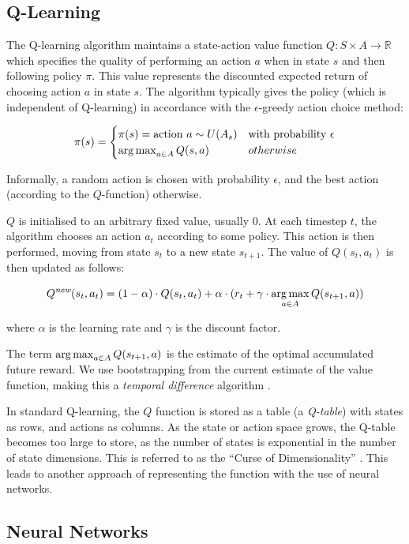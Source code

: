 \subsection{Q-Learning}
The Q-learning algorithm maintains a state-action value function $Q : S \times A \to \mathbb{R}$ which specifies the quality of performing an action $a$ when in state $s$ and then following policy $\pi$. This value represents the discounted expected return of choosing action $a$ in state $s$. The algorithm typically gives the policy (which is independent of Q-learning) in accordance with the $\epsilon$-greedy action choice method:


\[ \pi(s) = \begin{cases} 
      \pi(s) = \text{action } a \sim U(A_s) & \text{with probability $\epsilon$} \\
      \operatorname*{arg\,max}_{a \in A}Q(s,a) & otherwise                         
   \end{cases}
\]

Informally, a random action is chosen with probability $\epsilon$, and the best action (according to the $Q$-function) otherwise.

$Q$ is initialised to an arbitrary fixed value, usually $0$. At each timestep $t$, the algorithm chooses an action $a_t$ according to some policy. This action is then performed, moving from state $s_t$ to a new state $s_{t+1}$. The value of $Q(s_t,a_t)$ is then updated as follows:

\[Q^{\textit{new}}(s_t,a_t) = (1-\alpha) \cdot Q(s_t,a_t) + \alpha \cdot (r_t + \gamma \cdot \operatorname*{arg\,max}_{a \in A}Q(s_{t+1},a))\]

where $\alpha$ is the learning rate and $\gamma$ is the discount factor.

The term $\operatorname*{arg\,max}_{a \in A}Q(s_{t+1},a)$ is the estimate of the optimal accumulated future reward. We use bootstrapping from the current estimate of the value function, making this a \textit{temporal difference} algorithm \cite{RLAnIntro}.

In standard Q-learning, the $Q$ function is stored as a table (a \textit{Q-table}) with states as rows, and actions as columns. As the state or action space grows, the Q-table becomes too large to store, as the number of states is exponential in the number of state dimensions. This is referred to as the ``Curse of Dimensionality'' \cite{cod}. This leads to another approach of representing the function with the use of neural networks.


\subsection{Neural Networks}

